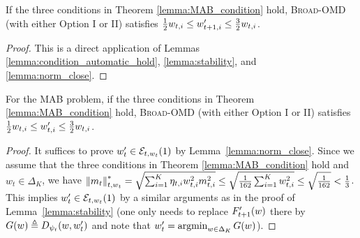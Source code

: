 \begin{lemma}
\label{lemma:2times_bound}
If the three conditions in Theorem \ref{lemma:MAB_condition} hold, \textsc{Broad-OMD} (with either Option I or II)
satisfies $\frac{1}{2}w_{t,i}\leq w^\prime_{t+1,i}\leq \frac{3}{2}w_{t,i}$.
\end{lemma}
\begin{proof}
This is a direct application of Lemmas \ref{lemma:condition_automatic_hold},  \ref{lemma:stability}, and \ref{lemma:norm_close}.


\end{proof}

\begin{lemma}
\label{lemma:2times_bound_another}
For the MAB problem, if the three conditions in Theorem \ref{lemma:MAB_condition} hold, \textsc{Broad-OMD} (with either Option I or II)
satisfies $\frac{1}{2}w_{t,i}\leq w^\prime_{t,i}\leq \frac{3}{2}w_{t,i}$.
\end{lemma}
\begin{proof}
It suffices to prove $w_{t}^\prime \in \mathcal{E}_{t,w_t}(1)$ by Lemma~\ref{lemma:norm_close}.
Since we assume that the three conditions in Theorem \ref{lemma:MAB_condition} hold and $w_t\in \Delta_K$, we have $\left\lVert m_t\right\rVert_{t,w_t}^*=\sqrt{\sum_{i=1}^K \eta_{t,i}w_{t,i}^2m_{t,i}^2}\leq \sqrt{\frac{1}{162}\sum_{i=1}^K w_{t,i}^2}\leq \sqrt{\frac{1}{162}}< \frac{1}{3}$. This implies $w_{t}^\prime \in \mathcal{E}_{t,w_t}(1)$ by a similar arguments as in the proof of Lemma~\ref{lemma:stability} (one only needs to replace $F_{t+1}^\prime(w)$ there by $G(w)\triangleq D_{\psi_t}(w,w_t^\prime)$ and note that $w_t^\prime=\operatorname*{argmin}_{w\in \Delta_K}G(w)$).
\end{proof}



